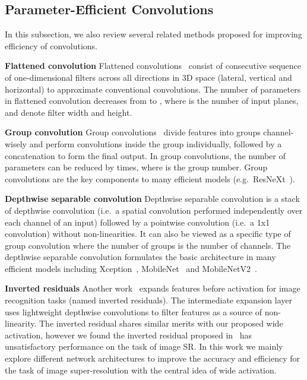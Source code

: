 \documentclass{article}
\begin{document}
\subsection{Parameter-Efficient Convolutions}

In this subsection, we also review several related methods proposed for improving efficiency of convolutions.

\textbf{Flattened convolution} Flattened convolutions~\cite{jin2014flattened} consist of consecutive sequence of one-dimensional filters across all directions in 3D space (lateral, vertical and horizontal) to approximate conventional convolutions. The number of parameters in flattened convolution decreases from  to , where  is the number of input planes,  and  denote filter width and height.

\textbf{Group convolution} Group convolutions~\cite{xie2017aggregated} divide features into groups channel-wisely and perform convolutions inside the group individually, followed by a concatenation to form the final output. In group convolutions, the number of parameters can be reduced by  times, where  is the group number. Group convolutions are the key components to many efficient models (e.g.\ ResNeXt~\cite{xie2017aggregated}).

\textbf{Depthwise separable convolution} Depthwise separable convolution is a stack of depthwise convolution (i.e.\ a spatial convolution performed independently over each channel of an input) followed by a pointwise convolution (i.e.\ a 1x1 convolution) without non-linearities. It can also be viewed as a specific type of group convolution where the number of groups  is the number of channels. The depthwise separable convolution formulates the basic architecture in many efficient models including Xception~\cite{chollet2016xception}, MobileNet~\cite{howard2017mobilenets} and MobileNetV2~\cite{2018arXiv180104381S}.

\textbf{Inverted residuals} Another work~\cite{2018arXiv180104381S} expands features before activation for image recognition tasks (named inverted residuals). The intermediate expansion layer uses lightweight depthwise convolutions to filter features as a source of non-linearity. The inverted residual shares similar merits with our proposed wide activation, however we found the inverted residual proposed in~\cite{2018arXiv180104381S} has unsatisfactory performance on the task of image SR. In this work we mainly explore different network architectures to improve the accuracy and efficiency for the task of image super-resolution with the central idea of wide activation. 
\end{document}
